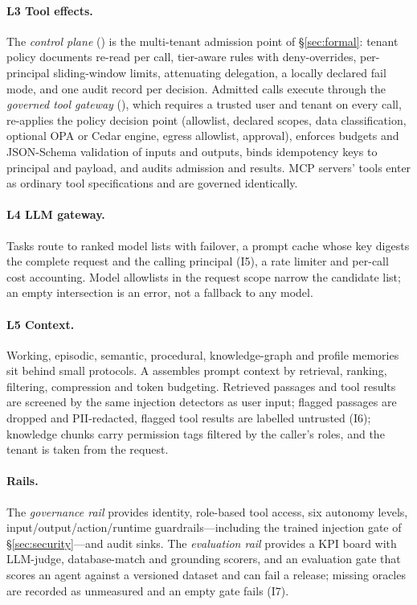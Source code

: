 \paragraph{L3 Tool effects.} The \emph{control plane} () is the multi-tenant admission point of \S\ref{sec:formal}: tenant policy documents re-read per call, tier-aware rules with deny-overrides, per-principal sliding-window limits, attenuating delegation, a locally declared fail mode, and one audit record per decision. Admitted calls execute through the \emph{governed tool gateway} (), which requires a trusted user and tenant on every call, re-applies the policy decision point (allowlist, declared scopes, data classification, optional OPA or Cedar engine, egress allowlist, approval), enforces budgets and JSON-Schema validation of inputs and outputs, binds idempotency keys to principal and payload, and audits admission and results. MCP servers' tools enter as ordinary tool specifications and are governed identically.

\paragraph{L4 LLM gateway.} Tasks route to ranked model lists with failover, a prompt cache whose key digests the complete request and the calling principal (I5), a rate limiter and per-call cost accounting. Model allowlists in the request scope narrow the candidate list; an empty intersection is an error, not a fallback to any model.

\paragraph{L5 Context.} Working, episodic, semantic, procedural, knowledge-graph and profile memories sit behind small protocols. A  assembles prompt context by retrieval, ranking, filtering, compression and token budgeting. Retrieved passages and tool results are screened by the same injection detectors as user input; flagged passages are dropped and PII-redacted, flagged tool results are labelled untrusted (I6); knowledge chunks carry permission tags filtered by the caller's roles, and the tenant is taken from the request.

\paragraph{Rails.} The \emph{governance rail} provides identity, role-based tool access, six autonomy levels, input/output/action/runtime guardrails---including the trained injection gate of \S\ref{sec:security}---and audit sinks. The \emph{evaluation rail} provides a KPI board with LLM-judge, database-match and grounding scorers, and an evaluation gate that scores an agent against a versioned dataset and can fail a release; missing oracles are recorded as unmeasured and an empty gate fails (I7).

